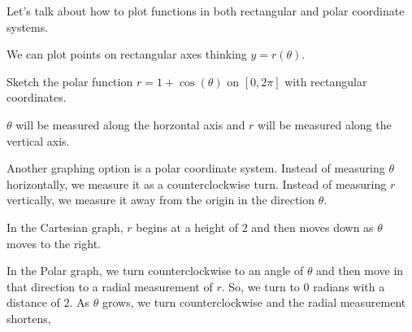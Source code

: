 \documentclass{ximera}
\begin{document}
Let's talk about how to plot functions in both rectangular and polar coordinate systems.  


We can plot points on rectangular axes thinking $y = r(\theta)$. 





\begin{example}
  Sketch the polar function $r=1+\cos(\theta)$ on $[0,2\pi]$ with rectangular coordinates.  


  $\theta$ will be measured along the horzontal axis and $r$ will be measured along the vertical axis.

    \begin{image}%
      \end{image}
\end{example}


Another graphing option is a polar coordinate system.  Instead of measuring $\theta$ horizontally, we measure it as a counterclockwise turn.  Instead of measuring $r$ vertically, we measure it away from the origin in the direction $\theta$.

In the Cartesian graph, $r$ begins at a height of $2$ and then moves down as $\theta$ moves to the right.

In the Polar graph, we turn counterclockwise to an angle of $\theta$ and then move in that direction to a radial measurement of $r$. So, we turn to $0$ radians with a distance of $2$.  As $\theta$ grows, we turn counterclockwise and the radial measurement shortens,

\begin{image}
\end{image}
\end{document}
